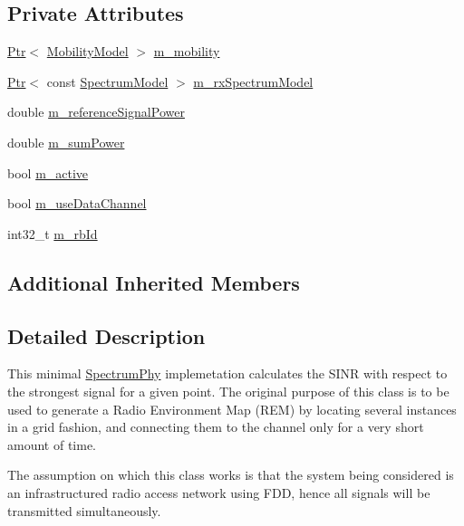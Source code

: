 \subsection*{Private Attributes}
\begin{DoxyCompactItemize}
\item 
\hyperlink{classns3_1_1Ptr}{Ptr}$<$ \hyperlink{classns3_1_1MobilityModel}{Mobility\+Model} $>$ \hyperlink{classns3_1_1RemSpectrumPhy_a3a74c7c0804db4dbd441b7ba8d54772d}{m\+\_\+mobility}
\item 
\hyperlink{classns3_1_1Ptr}{Ptr}$<$ const \hyperlink{classns3_1_1SpectrumModel}{Spectrum\+Model} $>$ \hyperlink{classns3_1_1RemSpectrumPhy_a94719955f9af198f8988a0edfdc2eca0}{m\+\_\+rx\+Spectrum\+Model}
\item 
double \hyperlink{classns3_1_1RemSpectrumPhy_a122a4b069be17e97c1df646a9d4f4506}{m\+\_\+reference\+Signal\+Power}
\item 
double \hyperlink{classns3_1_1RemSpectrumPhy_aa04c880a3c709f7125e1817845818517}{m\+\_\+sum\+Power}
\item 
bool \hyperlink{classns3_1_1RemSpectrumPhy_aaf04013201d8b634bdd992d6982f4415}{m\+\_\+active}
\item 
bool \hyperlink{classns3_1_1RemSpectrumPhy_af2cc6a40b67d0d47bbddfee708479779}{m\+\_\+use\+Data\+Channel}
\item 
int32\+\_\+t \hyperlink{classns3_1_1RemSpectrumPhy_a24612833420c9d757f2c83f3ce5d50b3}{m\+\_\+rb\+Id}
\end{DoxyCompactItemize}
\subsection*{Additional Inherited Members}


\subsection{Detailed Description}
This minimal \hyperlink{classns3_1_1SpectrumPhy}{Spectrum\+Phy} implemetation calculates the S\+I\+NR with respect to the strongest signal for a given point. The original purpose of this class is to be used to generate a Radio Environment Map (R\+EM) by locating several instances in a grid fashion, and connecting them to the channel only for a very short amount of time.

The assumption on which this class works is that the system being considered is an infrastructured radio access network using F\+DD, hence all signals will be transmitted simultaneously. 

